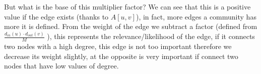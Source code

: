 \documentclass[epsfig,a4paper,11pt,titlepage,twoside,openany]{book}
\begin{document}
But what is the base of this multiplier factor? We can see that this is a positive value if the edge exists (thanks to $\displaystyle A \left[ u,v \right]$), in fact, more edges a community has more it is defined. From the weight of the edge we subtract a factor (defined from $\displaystyle \frac{ d_{in}\left(u\right) \cdot d_{out}\left(v\right) }{M}$ ), this represents the relevance/likelihood of the edge, if it connects two nodes with a high degree, this edge is not too important therefore we decrease its weight slightly, at the opposite is very important if connect two nodes that have low values of degree.
%
%
%
%
%
%
\ifcomment	%
\end{document}
